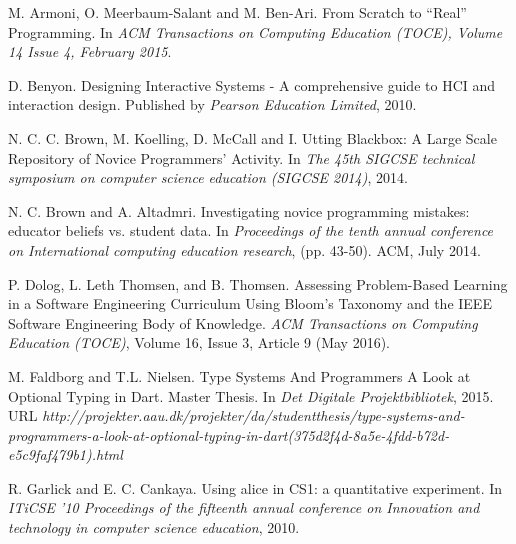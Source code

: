 \documentclass[preprint,10pt]{sigplanconf}
\begin{document}
\begin{thebibliography}{}
\softraggedright

M. Armoni, O. Meerbaum-Salant and M. Ben-Ari. \newblock From Scratch to “Real” Programming. \newblock In \emph{ACM Transactions on Computing Education (TOCE), Volume 14 Issue 4, February 2015}.

D. Benyon. \newblock Designing Interactive Systems - A comprehensive guide to HCI and interaction design. \newblock Published by \emph{Pearson Education Limited}, 2010.

N. C. C. Brown, M. Koelling, D. McCall and I. Utting \newblock Blackbox: A Large Scale Repository of Novice Programmers’ Activity. \newblock In \emph{The 45th SIGCSE technical symposium on computer science education (SIGCSE 2014)}, 2014.

N. C. Brown and A. Altadmri. \newblock Investigating novice programming mistakes: educator beliefs vs. student data. \newblock In \emph{Proceedings of the tenth annual conference on International computing education research}, (pp. 43-50). ACM, July 2014.

P. Dolog, L. Leth Thomsen, and B. Thomsen. \newblock Assessing Problem-Based Learning in a Software Engineering Curriculum Using Bloom’s Taxonomy and the IEEE Software Engineering Body of Knowledge. \newblock \emph{ACM Transactions on Computing Education (TOCE)}, Volume 16, Issue 3, Article 9 (May 2016).

M. Faldborg and T.L. Nielsen. \newblock Type Systems And Programmers \: A Look at Optional Typing in Dart. \newblock Master Thesis. In \emph{Det Digitale Projektbibliotek}, 2015.
\newblock URL \emph{http://projekter.aau.dk/projekter/da/studentthesis/type-systems-and-programmers-a-look-at-optional-typing-in-dart(375d2f4d-8a5e-4fdd-b72d-e5c9faf479b1).html}

R. Garlick and E. C. Cankaya. \newblock Using alice in CS1: a quantitative experiment. \newblock In \emph{ITiCSE '10 Proceedings of the fifteenth annual conference on Innovation and technology in computer science education}, 2010.


\end{thebibliography}
\end{document}
